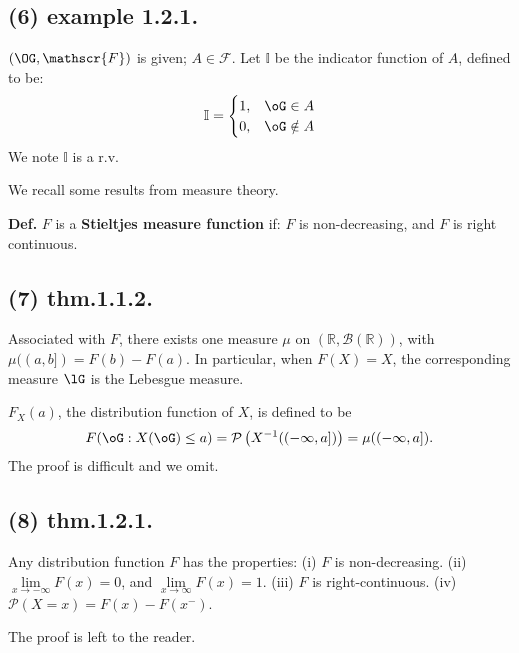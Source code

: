 \documentclass[12pt]{article}
\newcommand\oo\infty%
\newcommand{\Rb}[1]{ \left( #1 \right) }%
\newcommand{\BF}[1]{ \mathbb{#1} }%
\newcommand{\CF}[1]{ \mathcal{#1} }%
\newcommand{\SF}[1]{ \mathscr{#1} }%
\newcommand{\Ss}[1]{\textsf{\textbf{#1}}}%
\newcommand{\EqGo}[1]{ \begin{gather*}{#1}\end{gather*} } %
\renewcommand{\P}[1]{ \CF{P} \Rb{#1} }%
\begin{document}
\subsection*{(6) example 1.2.1.} \((\OG, \SF{F})\) is given; \(A\in \SF{F}\). 
Let \(\BF I\) be the indicator function of \(A\), defined to be: \begin{gather*}
\BF I =
 \begin{cases}
  1, & \oG \in A \\
  0, & \oG \notin A
 \end{cases}
\end{gather*} We note \(\BF I\) is a r.v. \par
We recall some results from measure theory. \par
\Ss{Def.} \(F\) is a \Ss{Stieltjes measure function} if: \(F\) is non-decreasing, and \(F\) is right continuous. 

\subsection*{(7) thm.1.1.2.} Associated with \(F\), there exists one measure \(\mu\) on \((\BF R, \CF{B}(\BF R))\), with \(\mu( (a,b] )= F(b)-F(a)\). 
In particular, when \(F(X) = X\), the corresponding measure \(\lG\) is the Lebesgue measure. \par
\(F_X(a)\), the distribution function of \(X\), is defined to be \EqGo{
 F(\oG: X(\oG) \leq a) 
 = \P{ X^{-1}((-\oo, a]) }
 = \mu( (-\oo, a] ). 
} The proof is difficult and we omit.

\subsection*{(8) thm.1.2.1.} Any distribution function \(F\) has the properties: 
(i) \(F\) is non-decreasing. 
(ii) \(\lim\limits_{x \to -\oo} F(x) =0\), and \(\lim\limits_{x \to \oo} F(x) =1\).
(iii) \(F\) is right-continuous. 
(iv) \(\P{ X=x } = F(x) - F(x^-) \). \par
The proof is left to the reader. 
\end{document}
